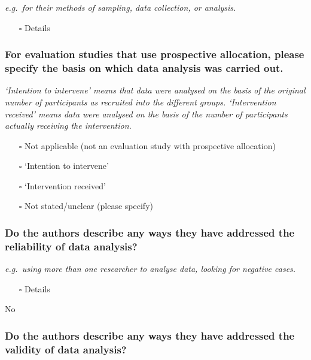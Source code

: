 \documentclass[
  doc, a4paper]{apa7}
\providecommand{\tightlist}{%
  \setlength{\itemsep}{0pt}\setlength{\parskip}{0pt}}
\begin{document}
\emph{e.g.~for their methods of sampling, data collection, or analysis.}

\begin{itemize}
\tightlist
\item[$\square$]
  Details
\end{itemize}

\subsubsection{For evaluation studies that use prospective allocation, please specify the basis on which data analysis was carried out.}\label{for-evaluation-studies-that-use-prospective-allocation-please-specify-the-basis-on-which-data-analysis-was-carried-out.}

\emph{`Intention to intervene' means that data were analysed on the basis of the original number of participants as recruited into the different groups. `Intervention received' means data were analysed on the basis of the number of participants actually receiving the intervention.}

\begin{itemize}
\tightlist
\item[$\square$]
  Not applicable (not an evaluation study with prospective allocation)
\item[$\square$]
  `Intention to intervene'
\item[$\square$]
  `Intervention received'
\item[$\square$]
  Not stated/unclear (please specify)
\end{itemize}

\subsubsection{Do the authors describe any ways they have addressed the reliability of data analysis?}\label{do-the-authors-describe-any-ways-they-have-addressed-the-reliability-of-data-analysis}

\emph{e.g.~using more than one researcher to analyse data, looking for negative cases.}

\begin{itemize}
\tightlist
\item[$\square$]
  Details
\end{itemize}

No

\subsubsection{Do the authors describe any ways they have addressed the validity of data analysis?}\label{do-the-authors-describe-any-ways-they-have-addressed-the-validity-of-data-analysis}
\end{document}
